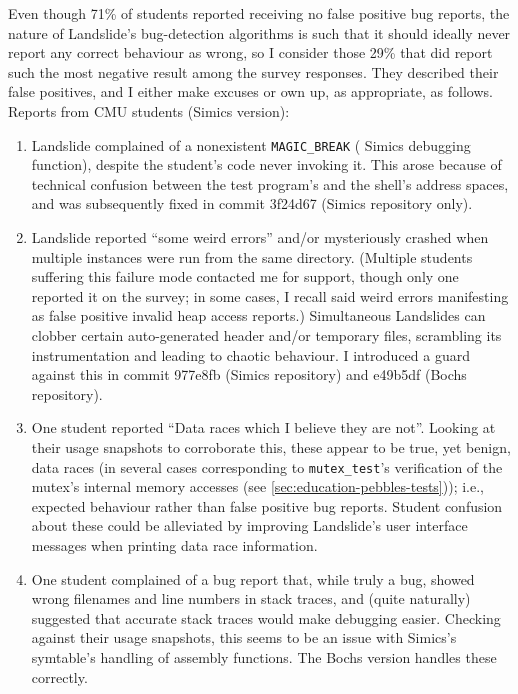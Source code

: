 Even though 71\% of students reported receiving no false positive bug reports,
the nature of Landslide's bug-detection algorithms is such
that it should ideally never report any correct behaviour as wrong,
so I consider those 29\% that did report such the most negative result among the survey responses.
They described their false positives, and I either make excuses or own up, as appropriate, as follows.
Reports from CMU students (Simics version):
\begin{enumerate}
	\item Landslide complained of a nonexistent {\tt MAGIC\_BREAK} ( Simics debugging function),
		despite the student's code never invoking it.
		This arose because of technical confusion between the test program's and the shell's address spaces,
		and was subsequently fixed in commit 3f24d67 (Simics repository only).
	\item Landslide reported ``some weird errors'' and/or mysteriously crashed
		when multiple instances were run from the same directory.
		(Multiple students suffering this failure mode contacted me for support,
		though only one reported it on the survey;
		in some cases, I recall said weird errors manifesting as false positive invalid heap access reports.)
		Simultaneous Landslides can clobber certain auto-generated header and/or temporary files,
		scrambling its instrumentation and leading to chaotic behaviour.
		I introduced a guard against this in commit 977e8fb (Simics repository) and e49b5df (Bochs repository).
	\item One student reported ``Data races which I believe they are not''.
		Looking at their usage snapshots to corroborate this,
		these appear to be true, yet benign, data races
		(in several cases corresponding to {\tt mutex\_test}'s verification of the mutex's internal memory accesses
		(see \cref{sec:education-pebbles-tests}));
		i.e., expected behaviour rather than false positive bug reports.
		Student confusion about these could be alleviated
		by improving Landslide's user interface messages when printing data race information. %
	\item One student complained of a bug report that, while truly a bug, showed wrong filenames and line numbers in stack traces,
		and (quite naturally) suggested that accurate stack traces would make debugging easier.
		Checking against their usage snapshots,
		this seems to be an issue with Simics's symtable's handling of assembly functions.
		The Bochs version handles these correctly.

\end{enumerate}
